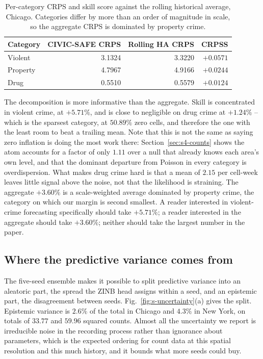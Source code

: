 \documentclass[journal,10pt,onecolumn]{IEEEtran}
\begin{document}
\begin{table}[!t]
  \centering
  \caption{Per-category CRPS and skill score against the rolling historical
  average, Chicago. Categories differ by more than an order of magnitude in
  scale, so the aggregate CRPS is dominated by property crime.}
  \label{tab:s-categories}
  \begin{tabular}{l r r r}
    \toprule
    \textbf{Category} & \textbf{CIVIC-SAFE CRPS} & \textbf{Rolling HA CRPS}
    & \textbf{CRPSS} \\
    \midrule
    Violent & 3.1324 & 3.3220 & $+0.0571$ \\
    Property & 4.7967 & 4.9166 & $+0.0244$ \\
    Drug & 0.5510 & 0.5579 & $+0.0124$ \\
    \bottomrule
  \end{tabular}
\end{table}

The decomposition is more informative than the aggregate. Skill is concentrated in
violent crime, at $+5.71\%$, and is close to negligible on drug crime at
$+1.24\%$ -- which is the sparsest category, at $50.89\%$ zero cells, and
therefore the one with the least room to beat a trailing mean. Note that this is
not the same as saying zero inflation is doing the most work there:
Section~\ref{sec:s4-counts} shows the atom accounts for a factor of only $1.11$
over a null that already knows each area's own level, and that the dominant
departure from Poisson in every category is overdispersion. What makes drug crime
hard is that a mean of $2.15$ per cell-week leaves little signal above the noise,
not that the likelihood is straining. The aggregate
$+3.60\%$ is a scale-weighted average dominated by property crime, the category on
which our margin is second smallest. A reader interested in violent-crime
forecasting specifically should take $+5.71\%$; a reader interested in the
aggregate should take $+3.60\%$; neither should take the largest number in the
paper.

\subsection{Where the predictive variance comes from}
\label{sec:s5-uncertainty}

The five-seed ensemble makes it possible to split predictive variance into an
aleatoric part, the spread the ZINB head assigns within a seed, and an epistemic
part, the disagreement between seeds. Fig.~\ref{fig:s-uncertainty}(a) gives the
split. Epistemic variance is $2.6\%$ of the total in Chicago and $4.3\%$ in New
York, on totals of $33.77$ and $59.96$ squared counts. Almost all the uncertainty
we report is irreducible noise in the recording process rather than ignorance about
parameters, which is the expected ordering for count data at this spatial
resolution and this much history, and it bounds what more seeds could buy.
\end{document}
